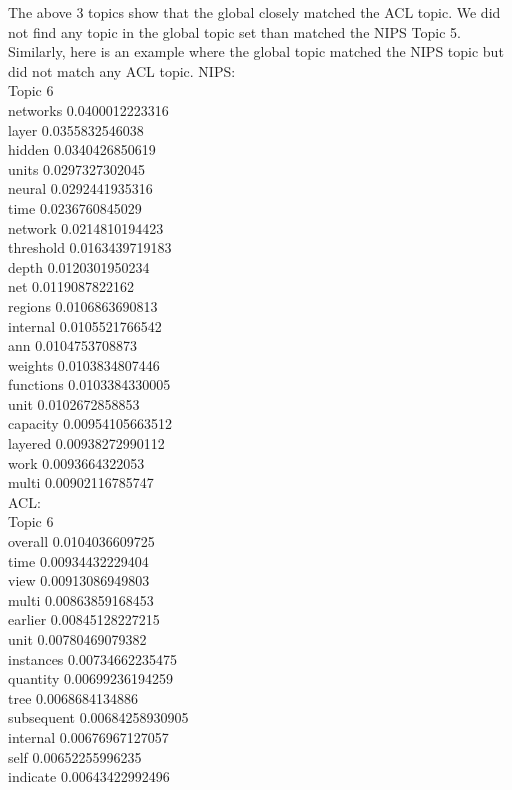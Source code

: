 \documentclass{article}
\begin{document}
The above 3 topics show that the global closely matched the ACL topic. We did not find any topic in the global topic set than matched the NIPS Topic 5.
Similarly, here is an example where the global topic matched the NIPS topic but did not match any ACL topic.
NIPS:\\
Topic 6\\
networks 0.0400012223316\\
layer 0.0355832546038\\
hidden 0.0340426850619\\
units 0.0297327302045\\
neural 0.0292441935316\\
time 0.0236760845029\\
network 0.0214810194423\\
threshold 0.0163439719183\\
depth 0.0120301950234\\
net 0.0119087822162\\
regions 0.0106863690813\\
internal 0.0105521766542\\
ann 0.0104753708873\\
weights 0.0103834807446\\
functions 0.0103384330005\\
unit 0.0102672858853\\
capacity 0.00954105663512\\
layered 0.00938272990112\\
work 0.0093664322053\\
multi 0.00902116785747\\
ACL:\\
Topic 6\\
overall 0.0104036609725\\
time 0.00934432229404\\
view 0.00913086949803\\
multi 0.00863859168453\\
earlier 0.00845128227215\\
unit 0.00780469079382\\
instances 0.00734662235475\\
quantity 0.00699236194259\\
tree 0.0068684134886\\
subsequent 0.00684258930905\\
internal 0.00676967127057\\
self 0.00652255996235\\
indicate 0.00643422992496\\
\end{document}
